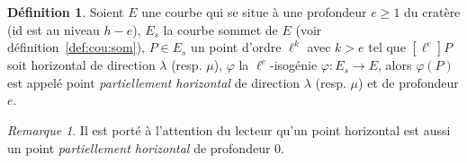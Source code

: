 \documentclass[10pt,a4paper]{book}
\theoremstyle{plain}
\theoremstyle{definition}
\theoremstyle{definition}
\theoremstyle{definition}
\theoremstyle{definition}
\newtheorem{defi}[thm]{Définition}
\theoremstyle{remark}
\newtheorem{rem}[thm]{Remarque}
\theoremstyle{remark}
\theoremstyle{definition}
\begin{document}
\begin{defi}
\label{def:par:hor}
Soient $E$ une courbe qui se situe à une profondeur $e \geqslant 1$ du cratère 
(id est au niveau $h-e$),
$E_s$ la courbe sommet de $E$ (voir définition~\ref{def:cou:som}), $P \in E_s$ 
un point d'ordre $\ell^k$ avec $k>e$ tel que $[\ell^e]P$ soit horizontal de 
direction $\lambda$ (resp. $\mu$), $\varphi$ la $\ell^e$-isogénie $\varphi:
E_s \rightarrow E$, alors $\varphi(P)$ est appelé point \emph{partiellement 
horizontal} de direction $\lambda$ (resp. $\mu$) et de profondeur $e$.
\end{defi}

\begin{rem}
Il est porté à l'attention du lecteur qu'un point horizontal est aussi un point
 \emph{partiellement horizontal} de profondeur $0$.
\end{rem}
\end{document}
